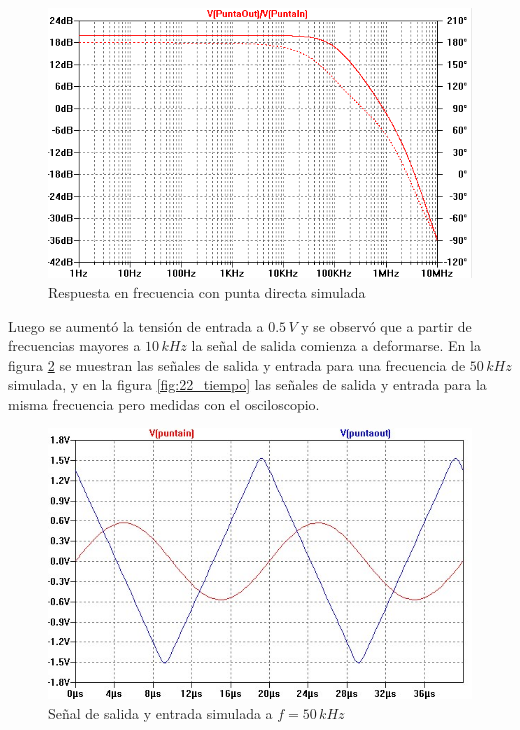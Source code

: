 \documentclass[10pt,spanish,a4paper,openany,notitlepage]{article}
\begin{document}
\begin{enumerate}
\begin{figure}[H]
\centering
\includegraphics[scale=0.8]{simulaciones/A2puntax1.png}
\caption{Respuesta en frecuencia con punta directa simulada}
\label{fig:2_1x}
\end{figure}

Luego se aumentó la tensión de entrada a $0.5\,\unit{V}$ y se observó que a partir de
frecuencias mayores a $10\,\unit{kHz}$ la señal de salida comienza a deformarse.
En la figura \ref{fig:2_tiempo} se muestran las señales de salida y entrada para una
frecuencia de $50\,\unit{kHz}$ simulada, y en la figura \ref{fig:22_tiempo} las señales de
salida y entrada para la misma frecuencia pero medidas con el osciloscopio.


\begin{figure}[H]
\centering
\includegraphics[scale=0.65]{simulaciones/A2sumo0,5V50KHz.png}
\caption{Señal de salida y entrada simulada a $f = 50\,\unit{kHz}$}
\label{fig:2_tiempo}
\end{figure}


\end{enumerate}
\end{document}
